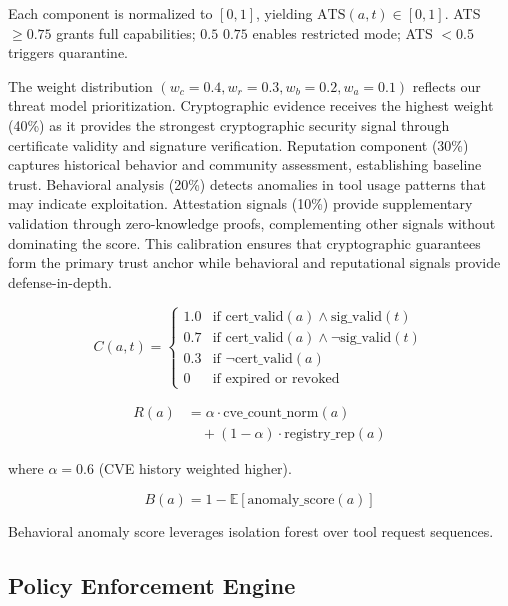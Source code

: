 \documentclass[12pt,twocolumn,journal]{IEEEtran}
\begin{document}
Each component is normalized to $[0, 1]$, yielding $\text{ATS}(a, t) \in [0, 1]$. ATS $\geq 0.75$ grants full capabilities; $0.5$ $0.75$ enables restricted mode; ATS $< 0.5$ triggers quarantine.

The weight distribution $(w_c = 0.4, w_r = 0.3, w_b = 0.2, w_a = 0.1)$ reflects our threat model prioritization. Cryptographic evidence receives the highest weight (40\%) as it provides the strongest cryptographic security signal through certificate validity and signature verification. Reputation component (30\%) captures historical behavior and community assessment, establishing baseline trust. Behavioral analysis (20\%) detects anomalies in tool usage patterns that may indicate exploitation. Attestation signals (10\%) provide supplementary validation through zero-knowledge proofs, complementing other signals without dominating the score. This calibration ensures that cryptographic guarantees form the primary trust anchor while behavioral and reputational signals provide defense-in-depth.

\begin{equation}
C(a, t) = \begin{cases}
1.0 & \text{if } \text{cert\_valid}(a) \land \text{sig\_valid}(t) \\
0.7 & \text{if } \text{cert\_valid}(a) \land \neg \text{sig\_valid}(t) \\
0.3 & \text{if } \neg \text{cert\_valid}(a) \\
0 & \text{if expired or revoked}
\end{cases}
\label{eq:crypto_component}
\end{equation}

\begin{equation}
\begin{split}
R(a) &= \alpha \cdot \text{cve\_count\_norm}(a) \\
     &\quad + (1-\alpha) \cdot \text{registry\_rep}(a)
\end{split}
\label{eq:reputation}
\end{equation}

where $\alpha = 0.6$ (CVE history weighted higher).

\begin{equation}
B(a) = 1 - \mathbb{E}[\text{anomaly\_score}(a)]
\label{eq:behavioral}
\end{equation}

Behavioral anomaly score leverages isolation forest over tool request sequences.

\subsection{Policy Enforcement Engine}
\end{document}
